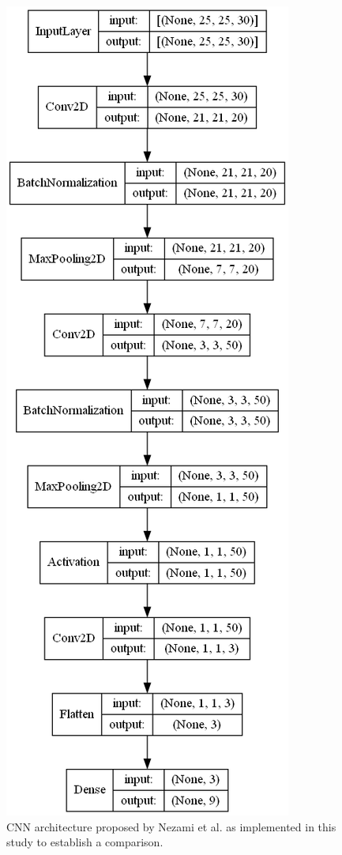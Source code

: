 \begin{figure}[bp]
    \centering
    \includegraphics[width=\linewidth]{figs/vineyard_classification/networks/nezami_25x24_20.png}
	\caption{CNN architecture proposed by Nezami et al. \cite{nezami_tree_2020} as implemented in this study to establish a comparison. }
	\label{fig:nezami_cnn}
\end{figure}


